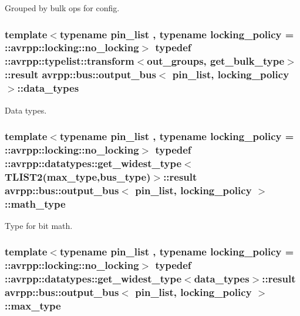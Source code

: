 Grouped by bulk ops for config. 

\hypertarget{structavrpp_1_1bus_1_1output__bus_af43086b918c5a21aa8fb7c188617fe19}{
\subsubsection[{data\_\-types}]{\setlength{\rightskip}{0pt plus 5cm}template$<$typename pin\_\-list , typename locking\_\-policy  = ::avrpp::locking::no\_\-locking$>$ typedef ::avrpp::typelist::transform$<${\bf out\_\-groups}, {\bf get\_\-bulk\_\-type}$>$::result {\bf avrpp::bus::output\_\-bus}$<$ pin\_\-list, locking\_\-policy $>$::{\bf data\_\-types}}}
\label{structavrpp_1_1bus_1_1output__bus_af43086b918c5a21aa8fb7c188617fe19}


Data types. 

\hypertarget{structavrpp_1_1bus_1_1output__bus_a71d3b9043b1bce0f980fdb938872ad36}{
\subsubsection[{math\_\-type}]{\setlength{\rightskip}{0pt plus 5cm}template$<$typename pin\_\-list , typename locking\_\-policy  = ::avrpp::locking::no\_\-locking$>$ typedef ::avrpp::datatypes::get\_\-widest\_\-type$<$TLIST2({\bf max\_\-type},{\bf bus\_\-type})$>$::result {\bf avrpp::bus::output\_\-bus}$<$ pin\_\-list, locking\_\-policy $>$::{\bf math\_\-type}}}
\label{structavrpp_1_1bus_1_1output__bus_a71d3b9043b1bce0f980fdb938872ad36}


Type for bit math. 

\hypertarget{structavrpp_1_1bus_1_1output__bus_aa104e237f02cc3070102da265320a669}{
\subsubsection[{max\_\-type}]{\setlength{\rightskip}{0pt plus 5cm}template$<$typename pin\_\-list , typename locking\_\-policy  = ::avrpp::locking::no\_\-locking$>$ typedef ::avrpp::datatypes::get\_\-widest\_\-type$<${\bf data\_\-types}$>$::result {\bf avrpp::bus::output\_\-bus}$<$ pin\_\-list, locking\_\-policy $>$::{\bf max\_\-type}}}
\label{structavrpp_1_1bus_1_1output__bus_aa104e237f02cc3070102da265320a669}


